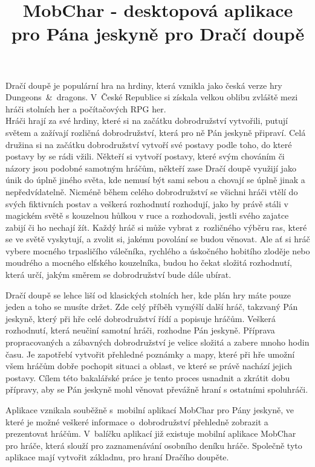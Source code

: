 \documentclass[thesis=B,czech]{resources/FITthesis}[2012/06/26]
\title{	MobChar - desktopová aplikace pro Pána jeskyně pro Dračí doupě}
\begin{document}

\begin{introduction}
Dračí doupě je populární hra na hrdiny, která vznikla jako česká verze hry Dungeons~\&~dragons. V~České Republice si získala velkou oblibu zvláště mezi hráči stolních her a počítačových RPG her.\\

Hráči hrají za své hrdiny, které si na začátku dobrodružství vytvořili, putují světem a zažívají rozličná dobrodružství, která pro ně Pán jeskyně připraví. Celá družina si na začátku dobrodružství vytvoří své postavy podle toho, do které postavy by se rádi vžili. Někteří si vytvoří postavy, které svým chováním či názory jsou podobné samotným hráčům, někteří zase Dračí doupě využijí jako únik do úplně jiného světa, kde nemusí být sami sebou a chovají se úplně jinak a nepředvídatelně. Nicméně během celého dobrodružství se všichni hráči vtělí do svých fiktivních postav a veškerá rozhodnutí rozhodují, jako by právě stáli v magickém světě s kouzelnou hůlkou v ruce a rozhodovali, jestli svého zajatce zabijí či ho nechají žít.
Každý hráč si může vybrat z~rozličného výběru ras, které se ve světě vyskytují, a zvolit si, jakému povolání se budou věnovat. Ale ať si hráč vybere mocného trpasličího válečníka, rychlého a úskočného hobitího zloděje nebo moudrého a mocného elfského kouzelníka, budou ho čekat složitá rozhodnutí, která určí, jakým směrem se dobrodružství bude dále ubírat. \par

Dračí doupě se lehce liší od klasických stolních her, kde plán hry máte pouze jeden a toho se musíte držet. Zde celý příběh vymýšlí další hráč, takzvaný Pán jeskyně, který při hře celé dobrodružství řídí a popisuje hráčům. Veškerá rozhodnutí, která neučiní samotní hráči, rozhodne Pán jeskyně. Příprava propracovaných a zábavných dobrodružství je velice složitá a zabere mnoho hodin času. Je zapotřebí vytvořit přehledné poznámky a mapy, které při hře umožní všem hráčům dobře pochopit situaci a oblast, ve které se právě nachází jejich postavy. Cílem této bakalářské práce je tento proces usnadnit a zkrátit dobu přípravy, aby se Pán jeskyně mohl věnovat převážně hraní s ostatními spoluhráči. \par

Aplikace vznikala souběžně s~mobilní aplikací MobChar pro Pány jeskyně\cite{Shanel_2017}, ve které je možné veškeré informace o~dobrodružství přehledně zobrazit a prezentovat hráčům. V~balíčku aplikací již existuje mobilní aplikace MobChar pro hráče, která slouží pro zaznamenávání osobního deníku hráče\cite{Weberova_2017}. Společně tyto aplikace mají vytvořit základnu, pro hraní Dračího doupěte. 


\end{introduction}
\end{document}
